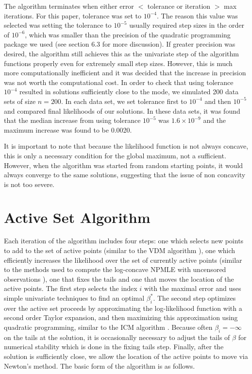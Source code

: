 	The algorithm terminates when either error $<$ tolerance or iteration $>$ max iterations. For this paper, tolerance was set to $10^{-4}$. The reason this value was selected was setting the tolerance to $10^{-5}$ usually required step sizes in the order of $10^{-6}$, which was smaller than the precision of the quadratic programming package we used (see section 6.3 for more discussion). If greater precision was desired, the algorithm still achieves this as the univariate step of the algorithm functions properly even for extremely small step sizes. However, this is much more computationally inefficient and it was decided that the increase in precision was not worth the computational cost. In order to check that using tolerance $10^{-4}$ resulted in solutions sufficiently close to the mode, we simulated 200 data sets of size $n = 200$. In each data set, we set tolerance first to $10^{-4}$ and then $10^{-5}$ and compared final likelihoods of our solutions. In these data sets, it was found that the median increase from using tolerance $10^{-5}$ was $1.6 \times 10^{-9}$ and the maximum increase was found to be 0.0020. 
	
	It is important to note that because the likelihood function is not always concave, this is only a necessary condition for the global maximum, not a sufficient. However, when the algorithm was started from random starting points, it would always converge to the same solutions, suggesting that the issue of non concavity is not too severe. 


{\section{Active Set Algorithm} }
\label{sec:5}	

	Each iteration of the algorithm includes four steps: one which selects new points to add to the set of active points (similar to the VDM algorithm \cite{RefF1972}), one which efficiently increases the likelihood over the set of currently active points (similar to the methods used to compute the log-concave NPMLE with uncensored observations \cite{RefDea2011}), one that fixes the tails and one that moves the location of the active points. The first step selects the index $i$ with the maximal error and uses simple univariate techniques to find an optimal $\beta_i^*$. The second step optimizes over the active set proceeds by approximating the log-likelihood function with a second order Taylor expansion, and then maximizing this approximation using quadratic programming, similar to the ICM algorithm \cite{RefJ1998}.  Because often $\beta_i = -\infty$ on the tails at the solution, it is occasionally necessary to adjust the tails of $\beta$ for numerical stability which is done in the fixing tails step. Finally, after the solution is sufficiently close, we allow the location of the active points to move via Newton's method. The basic form of the algorithm is as follows.
	

